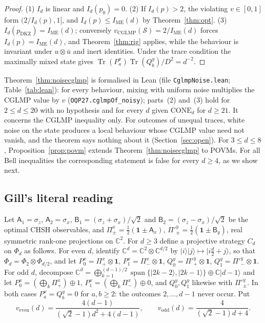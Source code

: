 \documentclass[11pt]{article}
\theoremstyle{remark}
\numberwithin{equation}{section}
\newcommand{\C}{\mathbb{C}}
\newcommand{\Tr}{\operatorname{Tr}}
\newcommand{\IME}{I_{\mathrm{ME}}}
\newcommand{\one}{\mathbf{1}}
\newcommand{\veven}{v_{\mathrm{even}}}
\newcommand{\vodd}{v_{\mathrm{odd}}}
\newcommand{\DKZ}{\mathrm{DKZ}}
\newcommand{\CONE}{\mathrm{CONE}}
\newcommand{\sA}{\mathsf{A}}
\newcommand{\sB}{\mathsf{B}}
\begin{document}
\begin{proof}
(1) $I_d$ is linear and $I_d(p_0)=0$. (2) If $I_d(p)>2$, the violating $v\in[0,1]$ form $(2/I_d(p),1]$, and
$I_d(p)\le\IME(d)$ by Theorem~\ref{thm:opt}. (3) $I_d(p_{\DKZ})=\IME(d)$; conversely
$v_{\mathrm{CGLMP}}(\mathcal S)=2/\IME(d)$ forces $I_d(p)=\IME(d)$, and Theorem~\ref{thm:rig} applies, while the behaviour
is invariant under $u\otimes\bar u$ and inert identities. Under the trace condition the maximally mixed state gives
$\Tr(P^x_a)\Tr(Q^y_b)/D^2=d^{-2}$.
\end{proof}

Theorem~\ref{thm:noisecglmp} is formalised in Lean (file \texttt{CglmpNoise.lean}; Table~\ref{tab:lean}): for every
behaviour, mixing with uniform noise multiplies the CGLMP value by $v$ (\nolinkurl{OQP27.cglmpOf_noisy}); parts~(2)
and~(3) hold for $2\le d\le20$ with no hypothesis and for every $d$ given $\CONE_d$ for $d\ge21$. It concerns the CGLMP
inequality only. For outcomes of unequal traces, white noise on the state produces a local behaviour whose CGLMP value
need not vanish, and the theorem says nothing about it (Section~\ref{sec:open}). For $3\le d\le8$,
Proposition~\ref{prop:povm} extends Theorem~\ref{thm:noisecglmp} to POVMs. For all Bell inequalities the corresponding
statement is false for every $d\ge4$, as we show next.

\subsection{Gill's literal reading}\label{subsec:literal}
Let $\sA_1=\sigma_z$, $\sA_2=\sigma_x$, $\sB_1=(\sigma_z+\sigma_x)/\sqrt2$ and $\sB_2=(\sigma_z-\sigma_x)/\sqrt2$ be the
optimal CHSH observables, and $\Pi^x_\pm=\frac12(\one\pm\sA_x)$, $\Pi'^y_\pm=\frac12(\one\pm\sB_y)$, real symmetric
rank-one projections on $\C^2$. For $d\ge3$ define a projective strategy $C_d$ on $\Phi_d$ as follows. For even $d$,
identify $\C^d=\C^2\otimes\C^{d/2}$ by $|i\rangle|j\rangle\mapsto|i\frac d2+j\rangle$, so that $\Phi_d=\Phi_2\otimes\Phi_{d/2}$,
and let $P^x_0=\Pi^x_+\otimes\one$, $P^x_1=\Pi^x_-\otimes\one$, $Q^y_0=\Pi'^y_+\otimes\one$, $Q^y_1=\Pi'^y_-\otimes\one$.
For odd $d$, decompose $\C^d=\bigoplus_{k=1}^{(d-1)/2}\operatorname{span}\{|2k-2\rangle,|2k-1\rangle\}\oplus\C|d-1\rangle$
and let $P^x_0=(\bigoplus_k\Pi^x_+)\oplus1$, $P^x_1=(\bigoplus_k\Pi^x_-)\oplus0$, and $Q^y_0,Q^y_1$ likewise with
$\Pi'^y_\pm$. In both cases $P^x_a=Q^y_b=0$ for $a,b\ge2$: the outcomes $2,\dots,d-1$ never occur. Put
\begin{equation}\label{eq:vevenodd}
\veven(d)=\frac{4(d-1)}{(\sqrt2-1)d^2+4(d-1)},\qquad\vodd(d)=\frac4{(\sqrt2-1)d+4}.
\end{equation}
\end{document}

